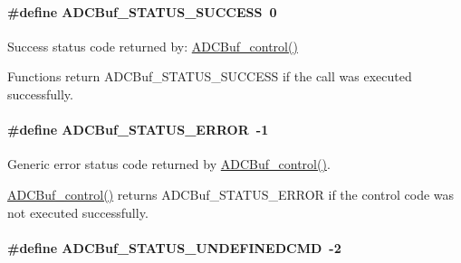 \paragraph[{A\+D\+C\+Buf\+\_\+\+S\+T\+A\+T\+U\+S\+\_\+\+S\+U\+C\+C\+E\+S\+S}]{\setlength{\rightskip}{0pt plus 5cm}\#define A\+D\+C\+Buf\+\_\+\+S\+T\+A\+T\+U\+S\+\_\+\+S\+U\+C\+C\+E\+S\+S~0}\label{_a_d_c_buf_8h_ac9c96db575dfaa6bcdfbd94cd875fbd4}


Success status code returned by\+: \hyperlink{_a_d_c_buf_8h_a9b9765fb0ac57dee9df234a79dcd5aea}{A\+D\+C\+Buf\+\_\+control()} 

Functions return A\+D\+C\+Buf\+\_\+\+S\+T\+A\+T\+U\+S\+\_\+\+S\+U\+C\+C\+E\+S\+S if the call was executed successfully. 
\paragraph[{A\+D\+C\+Buf\+\_\+\+S\+T\+A\+T\+U\+S\+\_\+\+E\+R\+R\+O\+R}]{\setlength{\rightskip}{0pt plus 5cm}\#define A\+D\+C\+Buf\+\_\+\+S\+T\+A\+T\+U\+S\+\_\+\+E\+R\+R\+O\+R~-\/1}\label{_a_d_c_buf_8h_a78f1a705377b5bb15cc6c152f75846e2}


Generic error status code returned by \hyperlink{_a_d_c_buf_8h_a9b9765fb0ac57dee9df234a79dcd5aea}{A\+D\+C\+Buf\+\_\+control()}. 

\hyperlink{_a_d_c_buf_8h_a9b9765fb0ac57dee9df234a79dcd5aea}{A\+D\+C\+Buf\+\_\+control()} returns A\+D\+C\+Buf\+\_\+\+S\+T\+A\+T\+U\+S\+\_\+\+E\+R\+R\+O\+R if the control code was not executed successfully. 
\paragraph[{A\+D\+C\+Buf\+\_\+\+S\+T\+A\+T\+U\+S\+\_\+\+U\+N\+D\+E\+F\+I\+N\+E\+D\+C\+M\+D}]{\setlength{\rightskip}{0pt plus 5cm}\#define A\+D\+C\+Buf\+\_\+\+S\+T\+A\+T\+U\+S\+\_\+\+U\+N\+D\+E\+F\+I\+N\+E\+D\+C\+M\+D~-\/2}\label{_a_d_c_buf_8h_a5d552a66f63d36a8eaffd53c9deff2f2}


